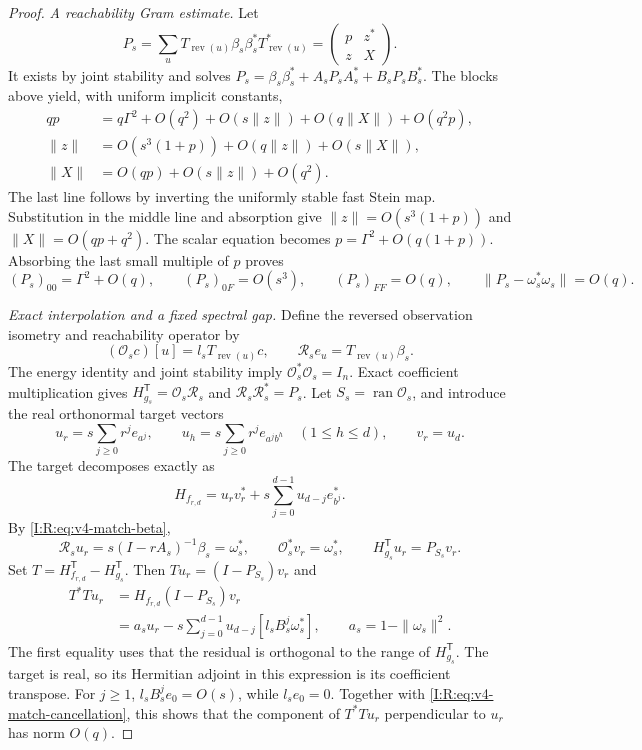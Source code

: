 \begin{proof}
\emph{A reachability Gram estimate.}
Let
\[
 P_s=\sum_u T_{\operatorname{rev}(u)}\beta_s\beta_s^*
                    T_{\operatorname{rev}(u)}^*
      =\begin{pmatrix}p&z^*\\z&X\end{pmatrix}.
\]
It exists by joint stability and solves
$P_s=\beta_s\beta_s^*+A_sP_sA_s^*+B_sP_sB_s^*$.
The blocks above yield, with uniform implicit constants,
\begin{align*}
 qp&=q\Gamma^2+O(q^2)+O(s\|z\|)+O(q\|X\|)+O(q^2p),\\
 \|z\|&=O(s^3(1+p))+O(q\|z\|)+O(s\|X\|),\\
 \|X\|&=O(qp)+O(s\|z\|)+O(q^2).
\end{align*}
The last line follows by inverting the uniformly stable fast Stein
map.  Substitution in the middle line and absorption give
$\|z\|=O(s^3(1+p))$ and $\|X\|=O(qp+q^2)$.
The scalar equation becomes
$p=\Gamma^2+O(q(1+p))$.  Absorbing the last small multiple of $p$
proves
\begin{equation}
 (P_s)_{00}=\Gamma^2+O(q),\qquad
 (P_s)_{0F}=O(s^3),\qquad (P_s)_{FF}=O(q),\qquad
 \|P_s-\omega_s^*\omega_s\|=O(q).
 \label{I:R:eq:v4-match-gram}
\end{equation}

\emph{Exact interpolation and a fixed spectral gap.}
Define the reversed observation isometry and reachability operator by
\[
 (\mathcal O_s c)[u]=l_sT_{\operatorname{rev}(u)}c,\qquad
 \mathcal R_s e_u=T_{\operatorname{rev}(u)}\beta_s.
\]
The energy identity and joint stability imply
$\mathcal O_s^*\mathcal O_s=I_n$.
Exact coefficient multiplication gives
$H_{g_s}^{\mathsf T}=\mathcal O_s\mathcal R_s$ and
$\mathcal R_s\mathcal R_s^*=P_s$.
Let $S_s=\operatorname{ran}\mathcal O_s$, and introduce the real
orthonormal target vectors
\[
 u_r=s\sum_{j\ge0}r^j e_{a^j},\qquad
 u_h=s\sum_{j\ge0}r^j e_{a^jb^h}\quad(1\le h\le d),
 \qquad v_r=u_d.
\]
The target decomposes exactly as
\[
 H_{f_{r,d}}=u_rv_r^*+
       s\sum_{j=0}^{d-1}u_{d-j}e_{b^j}^*.
\]
By \eqref{I:R:eq:v4-match-beta},
\[
 \mathcal R_su_r=s(I-rA_s)^{-1}\beta_s=\omega_s^*,\qquad
 \mathcal O_s^*v_r=\omega_s^*,\qquad
 H_{g_s}^{\mathsf T}u_r=P_{S_s}v_r.
\]
Set $T=H_{f_{r,d}}^{\mathsf T}-H_{g_s}^{\mathsf T}$.
Then $Tu_r=(I-P_{S_s})v_r$ and
\begin{align*}
 T^*Tu_r
 &=H_{f_{r,d}}(I-P_{S_s})v_r\\
 &=a_su_r-s\sum_{j=0}^{d-1}u_{d-j}
                  [l_sB_s^j\omega_s^*],\qquad
 a_s=1-\|\omega_s\|^2.
\end{align*}
The first equality uses that the residual is orthogonal to the range
of $H_{g_s}^{\mathsf T}$.  The target is real, so its Hermitian adjoint
in this expression is its coefficient transpose.  For $j\ge1$,
$l_sB_s^je_0=O(s)$, while $l_se_0=0$.
Together with \eqref{I:R:eq:v4-match-cancellation}, this shows that the
component of $T^*Tu_r$ perpendicular to $u_r$ has norm $O(q)$.


\end{proof}
